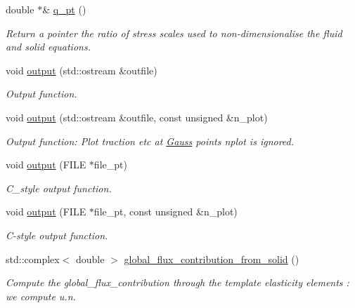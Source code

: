 \begin{DoxyCompactItemize}
double $\ast$\& \hyperlink{classoomph_1_1TimeHarmonicLinElastLoadedByPMLHelmholtzPressureBCElement_acec17c9c893e15d4d680d92f81a7f758}{q\+\_\+pt} ()
\begin{DoxyCompactList}\small\item\em Return a pointer the ratio of stress scales used to non-\/dimensionalise the fluid and solid equations. \end{DoxyCompactList}\item 
void \hyperlink{classoomph_1_1TimeHarmonicLinElastLoadedByPMLHelmholtzPressureBCElement_af349037cacaedb53f60de79415b83ac2}{output} (std\+::ostream \&outfile)
\begin{DoxyCompactList}\small\item\em Output function. \end{DoxyCompactList}\item 
void \hyperlink{classoomph_1_1TimeHarmonicLinElastLoadedByPMLHelmholtzPressureBCElement_a5b68e66db379729d4164df09dc00c681}{output} (std\+::ostream \&outfile, const unsigned \&n\+\_\+plot)
\begin{DoxyCompactList}\small\item\em Output function\+: Plot traction etc at \hyperlink{classoomph_1_1Gauss}{Gauss} points nplot is ignored. \end{DoxyCompactList}\item 
void \hyperlink{classoomph_1_1TimeHarmonicLinElastLoadedByPMLHelmholtzPressureBCElement_a1d9c27044ffbe07602f60ac7daef22af}{output} (F\+I\+LE $\ast$file\+\_\+pt)
\begin{DoxyCompactList}\small\item\em C\+\_\+style output function. \end{DoxyCompactList}\item 
void \hyperlink{classoomph_1_1TimeHarmonicLinElastLoadedByPMLHelmholtzPressureBCElement_a7e6d0ec6a0f9bec280fb4f520bf391f2}{output} (F\+I\+LE $\ast$file\+\_\+pt, const unsigned \&n\+\_\+plot)
\begin{DoxyCompactList}\small\item\em C-\/style output function. \end{DoxyCompactList}\item 
std\+::complex$<$ double $>$ \hyperlink{classoomph_1_1TimeHarmonicLinElastLoadedByPMLHelmholtzPressureBCElement_abd5ea8ff85472bc6c9d63d812142bd64}{global\+\_\+flux\+\_\+contribution\+\_\+from\+\_\+solid} ()
\begin{DoxyCompactList}\small\item\em Compute the global\+\_\+flux\+\_\+contribution through the template elasticity elements \+: we compute u.\+n. \end{DoxyCompactList}\item 

\end{DoxyCompactItemize}

